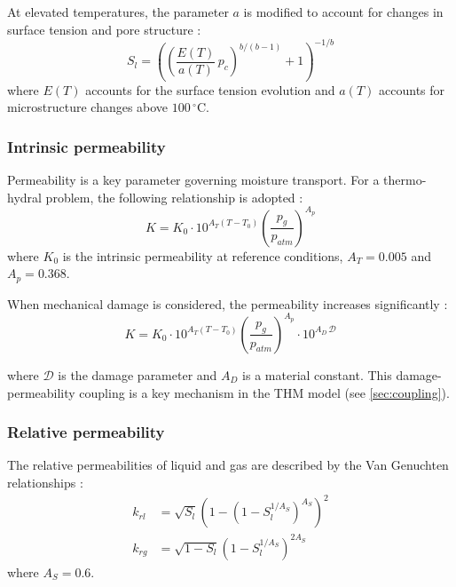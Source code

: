 At elevated temperatures, the parameter $a$ is modified to account for changes in surface tension and pore structure \cite{pesavento2000}:
\begin{equation}
    S_l = \left(\left(\frac{E(T)}{a(T)}\, p_c\right)^{b/(b-1)} + 1\right)^{-1/b}
    \label{eq:sorption_T}
\end{equation}
where $E(T)$ accounts for the surface tension evolution and $a(T)$ accounts for microstructure changes above $100\,^\circ$C.

\subsubsection{Intrinsic permeability}

Permeability is a key parameter governing moisture transport. For a thermo-hydral problem, the following relationship is adopted \cite{dauti2018}:
\begin{equation}
    K = K_0 \cdot 10^{A_T(T-T_0)} \left(\frac{p_g}{p_{atm}}\right)^{A_p}
    \label{eq:perm}
\end{equation}
where $K_0$ is the intrinsic permeability at reference conditions, $A_T = 0.005$ and $A_p = 0.368$.

When mechanical damage is considered, the permeability increases significantly \cite{dauti2018}:
\begin{equation}
    K = K_0 \cdot 10^{A_T(T-T_0)} \left(\frac{p_g}{p_{atm}}\right)^{A_p} \cdot 10^{A_D\, \mathcal{D}}
    \label{eq:perm_damage}
\end{equation}

where $\mathcal{D}$ is the damage parameter and $A_D$ is a material constant. This damage-permeability coupling is a key mechanism in the THM model (see \cref{sec:coupling}).

\subsubsection{Relative permeability}

The relative permeabilities of liquid and gas are described by the Van Genuchten relationships \cite{dauti2018}:
\begin{align}
    k_{rl} &= \sqrt{S_l}\left(
    1 - \left(1 - S_l^{1/A_S}\right)^{A_S}
    \right)^2 
    \label{eq:krl} \\
    k_{rg} &= \sqrt{1-S_l}\left(
    1 - S_l^{1/A_S}\right)^{2A_S}
    \label{eq:krg}
\end{align}
where $A_S = 0.6$.

